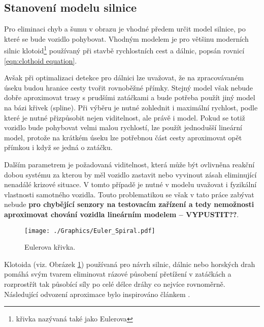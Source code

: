\documentclass[czech, bc, kky, he, iso690alph]{fasthesis}
\begin{document}
            \subsection{Stanovení modelu silnice}\label{chap:01_stanoveni_modelu_silnice}
                Pro eliminaci chyb a šumu v obrazu je vhodné předem určit model silnice, po které se bude vozidlo pohybovat. Vhodným modelem je pro většinu moderních silnic klotoid\footnote{křivka nazývaná také jako Eulerova} používaný při stavbě rychlostních cest a dálnic, popsán rovnicí \ref{eqn:clothoid equation}.
                
                Avšak při optimalizaci detekce pro dálnici lze uvažovat, že na zpracovávaném úseku budou hranice cesty tvořit rovnoběžné přímky. Stejný model však nebude dobře aproximovat trasy s prudšími zatáčkami a bude potřeba použít jiný model na bázi křivek (spline). Při výběru je nutné zohlednit i maximální rychlost, podle které je nutné přizpůsobit nejen viditelnost, ale právě i model. Pokud se totiž vozidlo bude pohybovat velmi malou rychlostí, lze použít jednodušší lineární model, protože na krátkém úseku lze potřebnou část cesty aproximovat opět přímkou i když se jedná o zatáčku.
                
                Dalším parametrem je požadovaná viditelnost, která může být ovlivněna reakční dobou systému za kterou by měl vozidlo zastavit nebo vyvinout zásah eliminující nenadálé krizové situace. V tomto případě je nutné v modelu uvažovat i fyzikální vlastnosti samotného vozidla. Touto problematikou se však v tato práce zabývat nebude \textbf{pro chybějící senzory na testovacím zařízení a tedy nemožnosti aproximovat chování vozidla lineárním modelem -- VYPUSTIT??}.
                
                	\begin{figure}[h]
                		\centering
                		\texttt{[image: ./Graphics/Euler\_Spiral.pdf]}
                		\caption{Eulerova křivka.}
                		\label{pic:Eulerova_krivka}
                	\end{figure}
                
                Klotoida (viz. Obrázek \ref{pic:Eulerova_krivka}) používaná pro návrh silnic, dálnic nebo horských drah pomáhá svým tvarem eliminovat rázové působení přetížení v zatáčkách a rozprostřít tak působící síly po celé délce dráhy co nejvíce rovnoměrně. Následující odvození aproximace bylo inspirováno článkem \cite{eliou_kaliabetsos_2013}.
                
\end{document}
